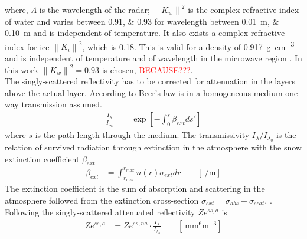 where, $\Lambda$ is the wavelength of the radar; $\left\| K_w \right\|^2$ is the complex refractive index of water and varies between \numlist{0.91;0.93} for wavelength between \SIlist{0.01;0.10}{\metre} and is independent of temperature. It also exists a  complex refractive index for ice $\left\| K_i \right\|^2$, which is \SI{0.18}{}. This is valid for a density of \SI{0.917}{\gram\per\cubic\cm} and is independent of temperature and of wavelength in the microwave region \citep{doviak_doppler_1993}. In this work  $\left\| K_w \right\|^2 = 0.93$ is chosen, \textcolor{red}{BECAUSE???}. 
\\
The singly-scattered reflectivity has to be corrected for attenuation in the layers above the actual layer. According to Beer's law is in a homogeneous medium one way transmission assumed. 
\begin{align}
	\frac{I_{\lambda}}{I_{\lambda_0}} & = \exp \left[ - \int_0^s \beta_{ext} ds'\right] \label{eq:Beer}
\end{align}
where $s$ is the path length through the medium. The transmissivity $I_{\lambda}/I_{\lambda_0}$ is the relation of survived radiation through extinction in the atmosphere with the snow extinction coefficient $\beta_{ext}$
\begin{align}
	\beta_{ext} & = \int_{r_{min}}^{r_{max}} n(r) \sigma_{ext} dr \qquad [\SI{}{\per\metre}] \label{eq:bext}
\end{align}
The extinction coefficient is the sum of absorption and scattering in the atmosphere followed from the extinction cross-section $\sigma_{ext} = \sigma_{abs} + \sigma_{scat}$, \citep{lohmann_introduction_2016,lamb_physics_2011}. \textcolor{red}{\cite[Eq. 12.1 and more][]{lohmann_introduction_2016}} \\
Following  the singly-scattered attenuated reflectivity $Ze^{ss, a}$ is
\begin{align}
	Ze^{ss, a} & = Ze^{ss, na} \cdot \frac{I_{\lambda}}{I_{\lambda_0}} \qquad [\SI{}{\mm^6\metre^{-3}}] \label{eq:sing_scatt_att_Z}
\end{align}
